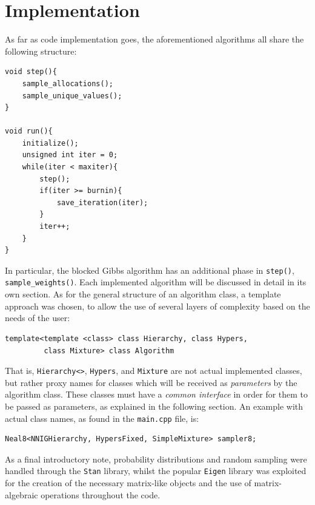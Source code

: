\section{Implementation}
As far as code implementation goes, the aforementioned algorithms all share the following structure:
\begin{verbatim}
void step(){
    sample_allocations();
    sample_unique_values();
}

void run(){
    initialize();
    unsigned int iter = 0;
    while(iter < maxiter){
        step();
        if(iter >= burnin){
            save_iteration(iter);
        }
        iter++;
    }
}
\end{verbatim}
In particular, the blocked Gibbs algorithm has an additional phase in \verb|step()|, \verb|sample_weights()|.
Each implemented algorithm will be discussed in detail in its own section.
As for the general structure of an algorithm class, a template approach was chosen, to allow the use of several layers of complexity based on the needs of the user:
\begin{verbatim}
template<template <class> class Hierarchy, class Hypers,
         class Mixture> class Algorithm
\end{verbatim}
That is, \verb|Hierarchy<>|, \verb|Hypers|, and \verb|Mixture| are not actual implemented classes, but rather proxy names for classes which will be received as \emph{parameters} by the algorithm class.
These classes must have a \emph{common interface} in order for them to be passed as parameters, as explained in the following section.
An example with actual class names, as found in the \verb|main.cpp| file, is:
\begin{verbatim}
Neal8<NNIGHierarchy, HypersFixed, SimpleMixture> sampler8;
\end{verbatim}
As a final introductory note, probability distributions and random sampling were handled through the \verb|Stan| library, whilst the popular \verb|Eigen| library was exploited for the creation of the necessary matrix-like objects and the use of matrix-algebraic operations throughout the code.

